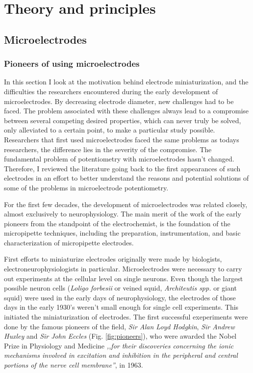 \chapter{Theory and principles}
\section{Microelectrodes}
\subsection{Pioneers of using microelectrodes}
In this section I look at the motivation behind electrode miniaturization, and the difficulties the researchers encountered during the early development of microelectrodes.
By decreasing electrode diameter, new challenges had to be faced.
The problem associated with these challenges always lead to a compromise between several competing desired properties, which can never truly be solved, only alleviated to a certain point, to make a particular study possible.
Researchers that first used microelectrodes faced the same problems as todays researchers, the difference lies in the severity of the compromise.
The fundamental problem of potentiometry with microelectrodes hasn't changed.
Therefore, I reviewed the literature going back to the first appearances of such electrodes in an effort to better understand the reasons and potential solutions of some of the problems in microelectrode potentiometry.

For the first few decades, the development of microelectrodes was related closely, almost exclusively to neurophysiology.
The main merit of the work of the early pioneers from the standpoint of the electrochemist, is the foundation of the micropipette techniques, including the preparation, instrumentation, and basic characterization of micropipette electrodes.

First efforts to miniaturize electrodes originally were made by biologists, electroneurophysiologists in particular.
Microelectrodes were necessary to carry out experiments at the cellular level on single neurons.
Even though the largest possible neuron cells (\emph{Loligo forbesii} or veined squid, \emph{Architeutis spp.} or giant squid) were used in the early days of neurophysiology, the electrodes of those days in the early 1930's weren't small enough for single cell experiments.
This initiated the miniaturization of electrodes.
The first successful exeperiments were done by the famous pioneers of the field, \emph{Sir Alan Loyd Hodgkin}, \emph{Sir Andrew Huxley} and \emph{Sir John Eccles} (Fig. \ref{fig:pioneers}), who were awarded the Nobel Prize in Physiology and Medicine \emph{,,for their discoveries concerning the ionic mechanisms involved in excitation and inhibition in the peripheral and central portions of the nerve cell membrane''}, in 1963. 

